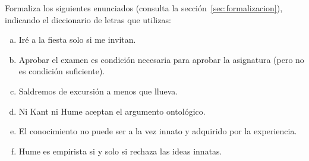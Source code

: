 \begin{pregunta}\label{e2-formal}
Formaliza los siguientes enunciados (consulta la sección~\ref{sec:formalizacion}), indicando el diccionario de letras que utilizas:
\begin{enumerate}[(a)]
    \item Iré a la fiesta solo si me invitan.
    \item Aprobar el examen es condición necesaria para aprobar la asignatura (pero no es condición suficiente).
    \item Saldremos de excursión a menos que llueva.
    \item Ni Kant ni Hume aceptan el argumento ontológico.
    \item El conocimiento no puede ser a la vez innato y adquirido por la experiencia.
    \item Hume es empirista si y solo si rechaza las ideas innatas.
\end{enumerate}
\end{pregunta}

